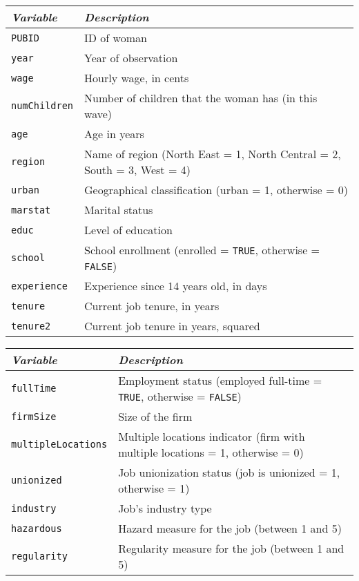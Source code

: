 \documentclass[11pt]{article}
\begin{document}
\vspace{1mm}
\begin{center}
\begin{tabular}{l p{13cm}}
 \hline
\textit{Variable} & \textit{Description} \\
\hline
{\tt PUBID} &            ID of woman \\
{\tt year} &               Year of observation \\
{\tt wage} &               Hourly wage, in cents \\
{\tt numChildren} &        Number of children that the woman has (in this wave) \\
{\tt age} &                Age in years \\
{\tt region} &             Name of region (North East = 1, North Central = 2, South = 3, West = 4) \\
{\tt urban} &              Geographical classification (urban = 1, otherwise = 0) \\     
{\tt marstat} &            Marital status \\
{\tt educ} &               Level of education \\
{\tt school} &             School enrollment (enrolled = {\tt TRUE}, otherwise = {\tt FALSE}) \\
{\tt experience} &         Experience since 14 years old, in days \\
{\tt tenure} &            Current job tenure, in years \\
{\tt tenure2} &            Current job tenure in years, squared \\
 \hline
\end{tabular}
\end{center}

\begin{center}
\begin{tabular}{l p{13cm}}
 \hline
\textit{Variable} & \textit{Description} \\
\hline
{\tt fullTime}   &        Employment status (employed full-time = {\tt TRUE}, otherwise = {\tt FALSE}) \\
{\tt firmSize} &           Size of the firm \\
{\tt multipleLocations} &   Multiple locations indicator (firm with multiple locations = 1, otherwise = 0) \\
{\tt unionized} &          Job unionization status (job is unionized = 1, otherwise = 1) \\
{\tt industry} &           Job's industry type \\
{\tt hazardous} &          Hazard measure for the job (between 1 and 5) \\
{\tt regularity} &         Regularity measure for the job (between 1 and 5) \\
 \hline
\end{tabular}
\end{center}
\end{document}
